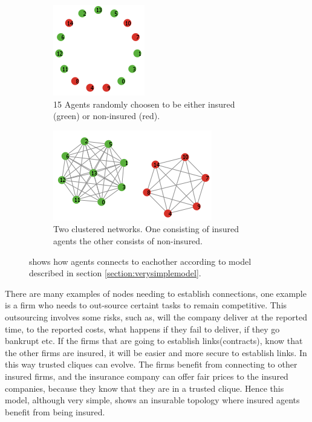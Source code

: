 \begin{figure}[h]
\centering
\begin{subfigure}{.5\textwidth}
  \centering
  \includegraphics[width=0.4\linewidth]{../Figures/firstModelWithNoParameters1.png}
  \caption{\label{fig:firstmod1} 15 Agents randomly choosen to be either insured (green) or non-insured (red).}
\end{subfigure}
\quad
\begin{subfigure}{.46\textwidth}
  \centering
  \includegraphics[width=0.8\linewidth]{../Figures/firstModelWithNoParameters2.png}
  \caption{\label{fig:firstmod2} Two clustered networks. One consisting of insured agents the other consists of non-insured.}
\end{subfigure}
\caption{\label{fig:fincont} shows how agents connects to eachother according to model described in section \ref{section:verysimplemodel}.}
\end{figure}

There are many examples of nodes needing to establish connections, one example is a firm who needs to out-source certaint tasks to remain competitive. This outsourcing involves some risks, such as, will the company deliver at the reported time, to the reported costs, what happens if they fail to deliver, if they go bankrupt etc. If the firms that are going to establish links(contracts), know that the other firms are insured, it will be easier and more secure to establish links. In this way trusted cliques can evolve. The firms benefit from connecting to other insured firms, and the insurance company can offer fair prices to the insured companies, because they know that they are in a trusted clique.
Hence this model, although very simple, shows an insurable topology where insured agents benefit from being insured. 

